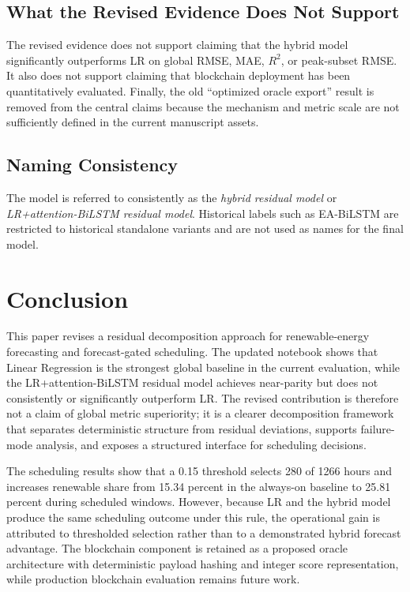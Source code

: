 \documentclass[journal]{IEEEtran}
\begin{document}
\subsection{What the Revised Evidence Does Not Support}
The revised evidence does not support claiming that the hybrid model significantly outperforms LR on global RMSE, MAE, $R^2$, or peak-subset RMSE. It also does not support claiming that blockchain deployment has been quantitatively evaluated. Finally, the old ``optimized oracle export'' result is removed from the central claims because the mechanism and metric scale are not sufficiently defined in the current manuscript assets.

\subsection{Naming Consistency}
The model is referred to consistently as the \emph{hybrid residual model} or \emph{LR+attention-BiLSTM residual model}. Historical labels such as EA-BiLSTM are restricted to historical standalone variants and are not used as names for the final model.

\section{Conclusion}
This paper revises a residual decomposition approach for renewable-energy forecasting and forecast-gated scheduling. The updated notebook shows that Linear Regression is the strongest global baseline in the current evaluation, while the LR+attention-BiLSTM residual model achieves near-parity but does not consistently or significantly outperform LR. The revised contribution is therefore not a claim of global metric superiority; it is a clearer decomposition framework that separates deterministic structure from residual deviations, supports failure-mode analysis, and exposes a structured interface for scheduling decisions.

The scheduling results show that a 0.15 threshold selects 280 of 1266 hours and increases renewable share from 15.34 percent in the always-on baseline to 25.81 percent during scheduled windows. However, because LR and the hybrid model produce the same scheduling outcome under this rule, the operational gain is attributed to thresholded selection rather than to a demonstrated hybrid forecast advantage. The blockchain component is retained as a proposed oracle architecture with deterministic payload hashing and integer score representation, while production blockchain evaluation remains future work.
\end{document}
